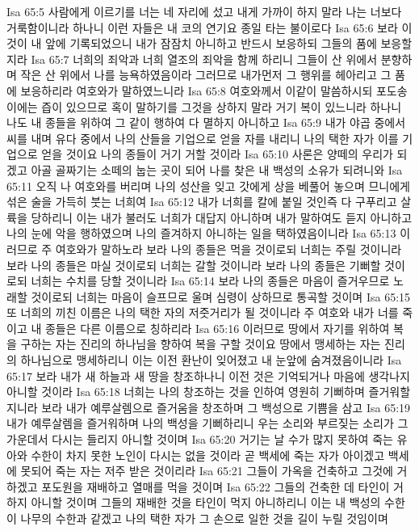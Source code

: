 Isa 65:5  사람에게 이르기를 너는 네 자리에 섰고 내게 가까이 하지 말라 나는 너보다 거룩함이니라 하나니 이런 자들은 내 코의 연기요 종일 타는 불이로다
Isa 65:6  보라 이것이 내 앞에 기록되었으니 내가 잠잠치 아니하고 반드시 보응하되 그들의 품에 보응할지라
Isa 65:7  너희의 죄악과 너희 열조의 죄악을 함께 하리니 그들이 산 위에서 분향하며 작은 산 위에서 나를 능욕하였음이라 그러므로 내가먼저 그 행위를 헤아리고 그 품에 보응하리라 여호와가 말하였느니라
Isa 65:8  여호와께서 이같이 말씀하시되 포도송이에는 즙이 있으므로 혹이 말하기를 그것을 상하지 말라 거기 복이 있느니라 하나니 나도 내 종들을 위하여 그 같이 행하여 다 멸하지 아니하고
Isa 65:9  내가 야곱 중에서 씨를 내며 유다 중에서 나의 산들을 기업으로 얻을 자를 내리니 나의 택한 자가 이를 기업으로 얻을 것이요 나의 종들이 거기 거할 것이라
Isa 65:10  사론은 양떼의 우리가 되겠고 아골 골짜기는 소떼의 눕는 곳이 되어 나를 찾은 내 백성의 소유가 되려니와
Isa 65:11  오직 나 여호와를 버리며 나의 성산을 잊고 갓에게 상을 베풀어 놓으며 므니에게 섞은 술을 가득히 붓는 너희여
Isa 65:12  내가 너희를 칼에 붙일 것인즉 다 구푸리고 살륙을 당하리니 이는 내가 불러도 너희가 대답지 아니하며 내가 말하여도 듣지 아니하고 나의 눈에 악을 행하였으며 나의 즐겨하지 아니하는 일을 택하였음이니라
Isa 65:13  이러므로 주 여호와가 말하노라 보라 나의 종들은 먹을 것이로되 너희는 주릴 것이니라 보라 나의 종들은 마실 것이로되 너희는 갈할 것이니라 보라 나의 종들은 기뻐할 것이로되 너희는 수치를 당할 것이니라
Isa 65:14  보라 나의 종들은 마음이 즐거우므로 노래할 것이로되 너희는 마음이 슬프므로 울며 심령이 상하므로 통곡할 것이며
Isa 65:15  또 너희의 끼친 이름은 나의 택한 자의 저줏거리가 될 것이니라 주 여호와 내가 너를 죽이고 내 종들은 다른 이름으로 칭하리라
Isa 65:16  이러므로 땅에서 자기를 위하여 복을 구하는 자는 진리의 하나님을 향하여 복을 구할 것이요 땅에서 맹세하는 자는 진리의 하나님으로 맹세하리니 이는 이전 환난이 잊어졌고 내 눈앞에 숨겨졌음이니라
Isa 65:17  보라 내가 새 하늘과 새 땅을 창조하나니 이전 것은 기억되거나 마음에 생각나지 아니할 것이라
Isa 65:18  너희는 나의 창조하는 것을 인하여 영원히 기뻐하며 즐거워할지니라 보라 내가 예루살렘으로 즐거움을 창조하며 그 백성으로 기쁨을 삼고
Isa 65:19  내가 예루살렘을 즐거워하며 나의 백성을 기뻐하리니 우는 소리와 부르짖는 소리가 그 가운데서 다시는 들리지 아니할 것이며
Isa 65:20  거기는 날 수가 많지 못하여 죽는 유아와 수한이 차지 못한 노인이 다시는 없을 것이라 곧 백세에 죽는 자가 아이겠고 백세에 못되어 죽는 자는 저주 받은 것이리라
Isa 65:21  그들이 가옥을 건축하고 그것에 거하겠고 포도원을 재배하고 열매를 먹을 것이며
Isa 65:22  그들의 건축한 데 타인이 거하지 아니할 것이며 그들의 재배한 것을 타인이 먹지 아니하리니 이는 내 백성의 수한이 나무의 수한과 같겠고 나의 택한 자가 그 손으로 일한 것을 길이 누릴 것임이며
